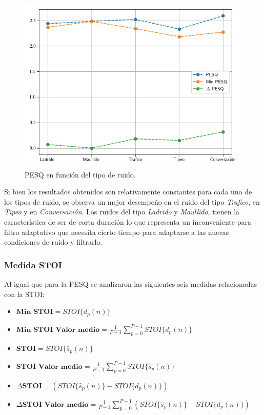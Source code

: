 \begin{figure}
	\centering
	\centerline{\includegraphics[scale=0.75]{images/ch6/af_metric_PESQ_noises.png}}
	\caption{PESQ en función del tipo de ruido.}
	\label{fig:ch6_pesq_resume_by_noise}
\end{figure} 

Si bien los resultados obtenidos son relativamente constantes para cada uno de los tipos de ruido, se observa un mejor desempeño en el ruido del tipo \emph{Trafico}, en \emph{Tipeo} y en \emph{Conversación}. Los ruidos del tipo \emph{Ladrido} y \emph{Maullido}, tienen la característica de ser de corta duración lo que representa un inconveniente para filtro adaptativo que necesita cierto tiempo para adaptarse a las nuevas condiciones de ruido y filtrarlo.

\subsubsection{Medida STOI}

Al igual que para la PESQ se analizaron las siguientes seis medidas relacionadas con la STOI:

\begin{itemize}
	\item $\textbf{Min STOI} = STOI\{ d_p(n) \}$
	\item $\textbf{Min STOI Valor medio} = \frac{1}{P-1} \sum_{p=0}^{P-1} STOI\{ d_p(n) \}$
	\item $\textbf{STOI} = STOI\{ \hat{s}_p(n) \}$
	\item $\textbf{STOI Valor medio} = \frac{1}{P-1} \sum_{p=0}^{P-1} STOI\{ \hat{s}_p(n) \}$
	\item $\Delta \textbf{STOI} = \left( STOI\{ \hat{s}_p(n) \} - STOI\{ d_p(n) \} \right)$
	\item $\Delta \textbf{STOI Valor medio} = \frac{1}{P-1} \sum_{p=0}^{P-1} \left( STOI\{ \hat{s}_p(n) \} - STOI\{ d_p(n) \} \right)$
\end{itemize}

